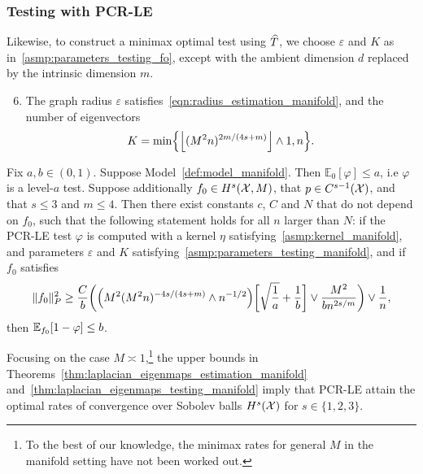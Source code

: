 \subsubsection{Testing with PCR-LE}
Likewise, to construct a minimax optimal test using $\widehat{T}$, we choose $\varepsilon$ and $K$ as in~\ref{asmp:parameters_testing_fo}, except with the ambient dimension $d$ replaced by the intrinsic dimension $m$.
\begin{enumerate}[label=(P\arabic*)]
	\setcounter{enumi}{5}
	\item 
	\label{asmp:parameters_testing_manifold}
	The graph radius $\varepsilon$ satisfies~\eqref{eqn:radius_estimation_manifold}, and the number of eigenvectors
	\begin{equation*}
	K = \min\Bigl\{\left\lfloor (M^2n)^{2m/(4s + m)} \right\rfloor \wedge 1,n \Bigr\}.
	\end{equation*}
\end{enumerate}

\begin{theorem}
	\label{thm:laplacian_eigenmaps_testing_manifold}
	Fix $a,b \in (0,1)$. Suppose Model~\ref{def:model_manifold}. Then $\mathbb{E}_0[\varphi] \leq a$, i.e $\varphi$ is a level-$a$ test. Suppose additionally $f_0 \in H^s(\mathcal{X},M)$, that $p \in C^{s-1}(\mathcal{X})$, and that $s \leq 3$ and $m \leq 4$. Then there exist constants $c$, $C$ and $N$ that do not depend on $f_0$, such that the following statement holds for all $n$ larger than $N$: if the PCR-LE test $\varphi$ is computed with a kernel $\eta$ satisfying~\ref{asmp:kernel_manifold}, and parameters $\varepsilon$ and $K$ satisfying~\ref{asmp:parameters_testing_manifold}, and if $f_0$ satisfies
	\begin{equation}
	\label{eqn:laplacian_eigenmaps_testing_criticalradius_manifold}
	\|f_0\|_P^2 \geq \frac{C}{b}\biggl(\Bigl(M^2(M^2n)^{-4s/(4s + m) } \wedge n^{-1/2}\Bigr)\biggl[\sqrt{\frac{1}{a}} + \frac{1}{b}\biggr] \vee \frac{M^2}{b n^{2s/m}} \biggr) \vee \frac{1}{n},
	\end{equation}
	then $\mathbb{E}_{f_0}[1 - \varphi] \leq b$.
\end{theorem}
Focusing on the case $M \asymp 1$,\footnote{To the best of our knowledge, the minimax rates for general $M$ in the manifold setting have not been worked out.} the upper bounds in Theorems~\ref{thm:laplacian_eigenmaps_estimation_manifold} and~\ref{thm:laplacian_eigenmaps_testing_manifold} imply that PCR-LE attain the optimal rates of convergence over Sobolev balls $H^s(\mathcal{X})$ for $s \in \{1,2,3\}$. 

